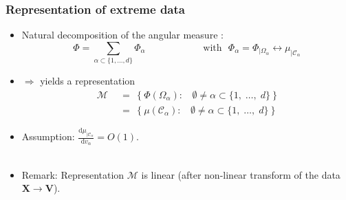 \documentclass[10pt]{beamer}
\newcommand{\ud}{\text{d}{}}
\newcommand\red{\color{red} }
\def\mb{\mathbf}
\begin{document}
\begin{frame}
  \frametitle{Representation of extreme data}
\begin{itemize}
\item Natural decomposition of the angular measure :
$$
\Phi = \sum_{\alpha\subset\{1,\dotsc,d\}} \Phi_\alpha \text{~~~~~~~~~~~~~~~~~~with~~} \Phi_\alpha = \Phi_{|\Omega_\alpha} \leftrightarrow \mu_{|\mathcal{C}_\alpha}
$$


\item $\Rightarrow$ yields a representation
{\red
\begin{align*}
\mathcal{M} ~~&=~~ \Big\{~\Phi(\Omega_{\alpha}):~~~~ \emptyset \neq \alpha\subset\{1,\; \ldots,\; d \}~\Big\}  \\
&=~~ \Big\{~\mu(\mathcal{C}_{\alpha}):~~~~ \emptyset \neq \alpha\subset\{1,\; \ldots,\; d \}~\Big\}
\end{align*}
}  

\item Assumption:  %
$\frac{\ud \mu_{|\mathcal{C}_\alpha}}{\ud v_\alpha} = O(1)$.\\~\\
 
\item Remark: Representation $\mathcal{M}$ is linear (after non-linear transform of the data $\mb X \to \mb V$).
\end{itemize}


\end{frame}
\end{document}
